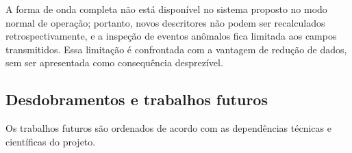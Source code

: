A forma de onda completa não está disponível no sistema proposto no modo normal de operação; portanto, novos descritores não podem ser recalculados retrospectivamente, e a inspeção de eventos anômalos fica limitada aos campos transmitidos. Essa limitação é confrontada com a vantagem de redução de dados, sem ser apresentada como consequência desprezível.

\subsection{Desdobramentos e trabalhos futuros}
\label{v2:subsec:trabalhos_futuros_conclusao}

Os trabalhos futuros são ordenados de acordo com as dependências técnicas e científicas do projeto.

